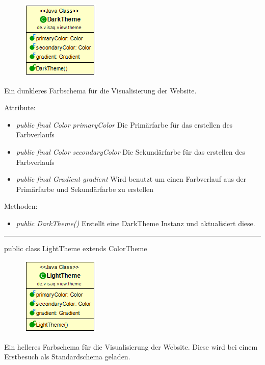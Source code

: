 \begin{minipage}{0.3\textwidth}
    \begin{figure}[H]
        \includegraphics[scale = 0.5]{media/frontend/view/de.view.elements.theme/DarkTheme_Class.png}
    \end{figure}
    \end{minipage} \hfill
    \begin{minipage}{0.6\textwidth}
       Ein dunkleres Farbschema für die Visualisierung der Website.
    \end{minipage}

Attribute:
\begin{itemize}
    \item \emph{public final Color primaryColor} Die Primärfarbe für das erstellen des Farbverlaufs
    \item \emph{public final Color secondaryColor} Die Sekundärfarbe für das erstellen des Farbverlaufs
    \item \emph{public final Gradient gradient} Wird benutzt um einen Farbverlauf aus der Primärfarbe und Sekundärfarbe zu erstellen
\end{itemize}
Methoden:
\begin{itemize} 
    \item \emph{public DarkTheme()} Erstellt eine DarkTheme Instanz und aktualisiert diese.
\end{itemize}

\rule{\textwidth}{0.4pt} 
public class LightTheme extends ColorTheme

\begin{minipage}{0.3\textwidth}
    \begin{figure}[H]
        \includegraphics[scale = 0.5]{media/frontend/view/de.view.elements.theme/LightTheme_Class.png}
    \end{figure}
    \end{minipage} \hfill
    \begin{minipage}{0.6\textwidth}
        Ein helleres Farbschema für die Visualisierung der Website. Diese wird bei einem Erstbesuch als Standardschema geladen.
    \end{minipage}

